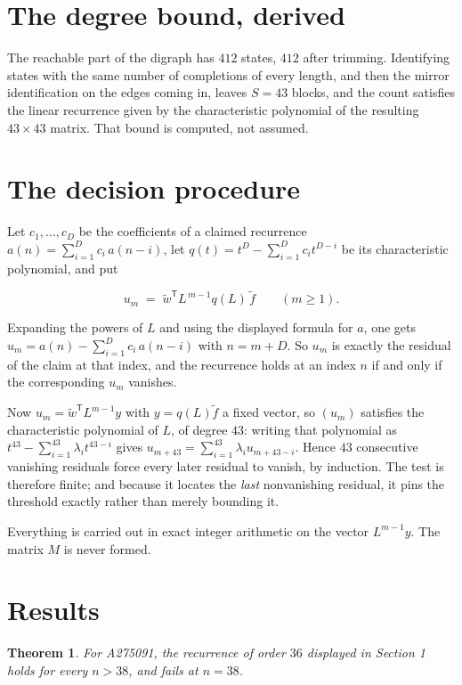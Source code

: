 \documentclass[11pt]{article}
\newtheorem{theorem}{Theorem}
\theoremstyle{definition}
\begin{document}
\section{The degree bound, derived}

The reachable part of the digraph has $412$ states, $412$ after trimming. Identifying states with the same number of completions of every length, and then the mirror identification on the edges coming in, leaves $S = 43$ blocks, and the count satisfies the linear recurrence given by the characteristic polynomial of the resulting $43\times43$ matrix. That bound is computed, not assumed.

\section{The decision procedure}

Let $c_1,\dots,c_D$ be the coefficients of a claimed recurrence $a(n) = \sum_{i=1}^{D} c_i\,a(n-i)$, let $q(t) = t^{D} - \sum_{i=1}^{D} c_i t^{D-i}$ be its characteristic polynomial, and put

\[u_m \;=\; \tilde w^{\mathsf T} L^{\,m-1} q(L)\,\tilde f \qquad (m \ge 1).\]

Expanding the powers of $L$ and using the displayed formula for $a$, one gets $u_m = a(n) - \sum_{i=1}^{D} c_i\,a(n-i)$ with $n = m + D$. So $u_m$ is exactly the residual of the claim at that index, and the recurrence holds at an index $n$ if and only if the corresponding $u_m$ vanishes.

Now $u_m = \tilde w^{\mathsf T} L^{m-1} y$ with $y = q(L)\tilde f$ a fixed vector, so $(u_m)$ satisfies the characteristic polynomial of $L$, of degree $43$: writing that polynomial as $t^{43} - \sum_{i=1}^{43} \lambda_i t^{43-i}$ gives $u_{m+43} = \sum_{i=1}^{43} \lambda_i u_{m+43-i}$. Hence $43$ consecutive vanishing residuals force every later residual to vanish, by induction. The test is therefore finite; and because it locates the {\itshape last} nonvanishing residual, it pins the threshold exactly rather than merely bounding it.

Everything is carried out in exact integer arithmetic on the vector $L^{m-1}y$. The matrix $M$ is never formed.

\section{Results}

\begin{theorem} For A275091, the recurrence of order $36$ displayed in Section 1 holds for every $n > 38$, and fails at $n = 38$.\end{theorem}
\end{document}
